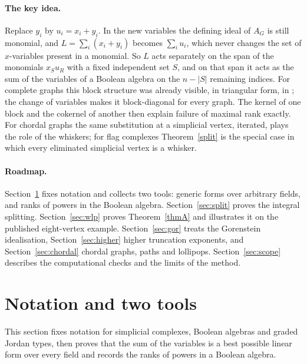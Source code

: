 \documentclass[11pt,a4paper]{article}
\theoremstyle{definition}
\begin{document}
\paragraph{The key idea.}
Replace $y_i$ by $u_i=x_i+y_i$. In the new variables the defining ideal of $A_G$ is still monomial, and $L=\sum_i(x_i+y_i)$ becomes $\sum_iu_i$, which never changes the set of $x$-variables present in a monomial. So $L$ acts separately on the span of the monomials $x_Su_R$ with a fixed independent set $S$, and on that span it acts as the sum of the variables of a Boolean algebra on the $n-|S|$ remaining indices. For complete graphs this block structure was already visible, in triangular form, in \cite[Lemma~3.1]{HN}; the change of variables makes it block-diagonal for every graph. The kernel of one block and the cokernel of another then explain failure of maximal rank exactly. For chordal graphs the same substitution at a simplicial vertex, iterated, plays the role of the whiskers; for flag complexes Theorem~\ref{split} is the special case in which every eliminated simplicial vertex is a whisker.

\paragraph{Roadmap.}
Section~\ref{sec:prelim} fixes notation and collects two tools: generic forms over arbitrary fields, and ranks of powers in the Boolean algebra. Section~\ref{sec:split} proves the integral splitting. Section~\ref{sec:wlp} proves Theorem~\ref{thmA} and illustrates it on the published eight-vertex example. Section~\ref{sec:gor} treats the Gorenstein idealisation, Section~\ref{sec:higher} higher truncation exponents, and Section~\ref{sec:chordal} chordal graphs, paths and lollipops. Section~\ref{sec:scope} describes the computational checks and the limits of the method.

\section{Notation and two tools}\label{sec:prelim}

This section fixes notation for simplicial complexes, Boolean algebras and graded Jordan types, then proves that the sum of the variables is a best possible linear form over every field and records the ranks of powers in a Boolean algebra.
\end{document}
